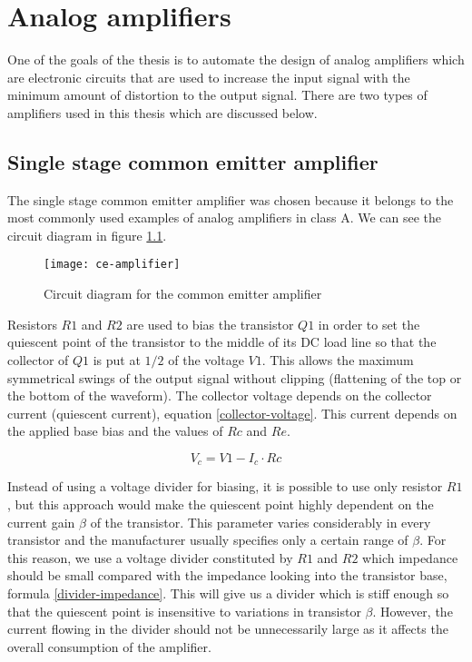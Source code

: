 \chapter{Analog amplifiers}
One of the goals of the thesis is to automate the design of analog amplifiers which are electronic circuits that are used to increase the input signal with the minimum amount of distortion to the output signal. There are two types of amplifiers used in this thesis which are discussed below.

\section{Single stage common emitter amplifier} \label{ce-amp}
The single stage common emitter amplifier was chosen because it belongs to the most commonly used examples of analog amplifiers in class A. We can see the circuit diagram in figure \ref{ce-amplifier}.

\begin{figure}[H]
    \centering
    \texttt{[image: ce-amplifier]}
    \label{ce-amplifier}
    \caption{Circuit diagram for the common emitter amplifier}
\end{figure}

Resistors $R1$ and $R2$ are used to bias the transistor $Q1$ in order to set the quiescent point of the transistor to the middle of its DC load line so that the collector of $Q1$ is put at $1/2$ of the voltage $V1$. This allows the maximum symmetrical swings of the output signal without clipping (flattening of the top or the bottom of the waveform). The collector voltage depends on the collector current (quiescent current), equation \ref{collector-voltage}. This current depends on the applied base bias and the values of $Rc$ and $Re$.

\begin{equation} \label{collector-voltage}
    V_c = V1 - I_c \cdot Rc
\end{equation}

Instead of using a voltage divider for biasing, it is possible to use only resistor $R1$, but this approach would make the quiescent point highly dependent on the current gain $\beta$ of the transistor. This parameter varies considerably in every transistor and the manufacturer usually specifies only a certain range of $\beta$. For this reason, we use a voltage divider constituted by $R1$ and $R2$ which impedance should be small compared with the impedance looking into the transistor base, formula \ref{divider-impedance}. This will give us a divider which is stiff enough so that the quiescent point is insensitive to variations in transistor $\beta$. However, the current flowing in the divider should not be unnecessarily large as it affects the overall consumption of the amplifier.

